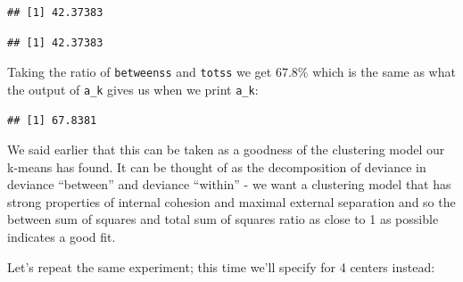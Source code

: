 \documentclass[]{article}
\newenvironment{Shaded}{\begin{snugshade}}{\end{snugshade}}
\newcommand{\DataTypeTok}[1]{\textcolor[rgb]{0.13,0.29,0.53}{#1}}
\newcommand{\DecValTok}[1]{\textcolor[rgb]{0.00,0.00,0.81}{#1}}
\newcommand{\FloatTok}[1]{\textcolor[rgb]{0.00,0.00,0.81}{#1}}
\newcommand{\KeywordTok}[1]{\textcolor[rgb]{0.13,0.29,0.53}{\textbf{#1}}}
\newcommand{\NormalTok}[1]{#1}
\newcommand{\OperatorTok}[1]{\textcolor[rgb]{0.81,0.36,0.00}{\textbf{#1}}}
\newcommand{\StringTok}[1]{\textcolor[rgb]{0.31,0.60,0.02}{#1}}
\begin{document}
\begin{verbatim}
## [1] 42.37383
\end{verbatim}

\begin{Shaded}
\end{Shaded}

\begin{verbatim}
## [1] 42.37383
\end{verbatim}

Taking the ratio of \texttt{betweenss} and \texttt{totss} we get 67.8\%
which is the same as what the output of \texttt{a\_k} gives us when we
print \texttt{a\_k}:

\begin{Shaded}
\end{Shaded}

\begin{verbatim}
## [1] 67.8381
\end{verbatim}

We said earlier that this can be taken as a goodness of the clustering
model our k-means has found. It can be thought of as the decomposition
of deviance in deviance ``between'' and deviance ``within'' - we want a
clustering model that has strong properties of internal cohesion and
maximal external separation and so the between sum of squares and total
sum of squares ratio as close to 1 as possible indicates a good fit.

Let's repeat the same experiment; this time we'll specify for 4 centers
instead:

\begin{Shaded}
\end{Shaded}
\end{document}
